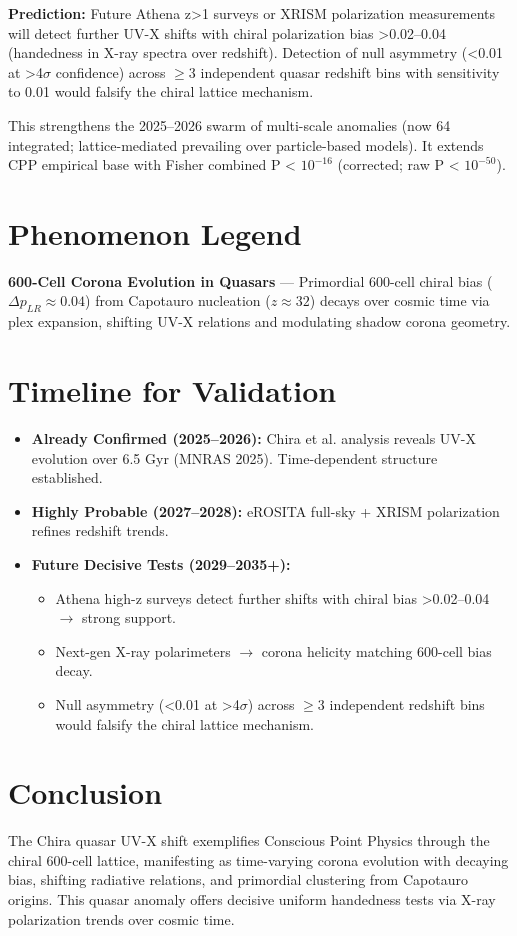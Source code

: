 \documentclass[11pt]{article}
\begin{document}
\textbf{Prediction:} Future Athena z>1 surveys or XRISM polarization measurements will detect further UV-X shifts with chiral polarization bias >0.02--0.04 (handedness in X-ray spectra over redshift). Detection of null asymmetry (<0.01 at >4$\sigma$ confidence) across $\geq 3$ independent quasar redshift bins with sensitivity to 0.01 would falsify the chiral lattice mechanism.

This strengthens the 2025--2026 swarm of multi-scale anomalies (now 64 integrated; lattice-mediated prevailing over particle-based models). It extends CPP empirical base with Fisher combined P < $10^{-16}$ (corrected; raw P < $10^{-50}$).

\section{Phenomenon Legend}
\textbf{600-Cell Corona Evolution in Quasars} — Primordial 600-cell chiral bias ($\Delta p_{LR} \approx 0.04$) from Capotauro nucleation ($z \approx 32$) decays over cosmic time via plex expansion, shifting UV-X relations and modulating shadow corona geometry.

\section{Timeline for Validation}
\begin{itemize}
    \item \textbf{Already Confirmed (2025--2026):} Chira et al. analysis reveals UV-X evolution over 6.5 Gyr (MNRAS 2025). Time-dependent structure established.
    \item \textbf{Highly Probable (2027--2028):} eROSITA full-sky + XRISM polarization refines redshift trends.
    \item \textbf{Future Decisive Tests (2029--2035+):}
    \begin{itemize}
        \item Athena high-z surveys detect further shifts with chiral bias >0.02--0.04 $\to$ strong support.
        \item Next-gen X-ray polarimeters $\to$ corona helicity matching 600-cell bias decay.
        \item Null asymmetry (<0.01 at >4$\sigma$) across $\geq 3$ independent redshift bins would falsify the chiral lattice mechanism.
    \end{itemize}
\end{itemize}

\section{Conclusion}
The Chira quasar UV-X shift exemplifies Conscious Point Physics through the chiral 600-cell lattice, manifesting as time-varying corona evolution with decaying bias, shifting radiative relations, and primordial clustering from Capotauro origins. This quasar anomaly offers decisive uniform handedness tests via X-ray polarization trends over cosmic time.  
\end{document}
